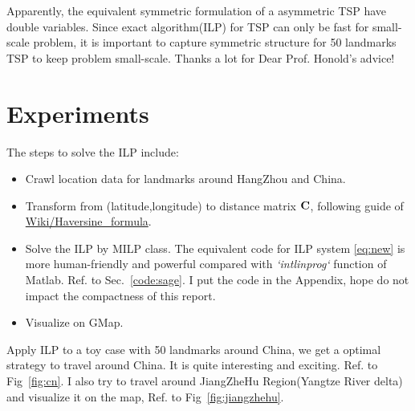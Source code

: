 \documentclass{mcmthesis}
\begin{document}
Apparently, the equivalent symmetric formulation of a asymmetric TSP have double variables. Since  exact algorithm(ILP) for TSP can only  be fast for small-scale problem, it is important to capture symmetric structure for 50 landmarks TSP to keep problem small-scale. Thanks a lot for Dear Prof. Honold's advice!
\section{Experiments}

The steps to solve the ILP include: 
\begin{itemize}[noitemsep,nolistsep]
	\item Crawl location data for landmarks around HangZhou and China. 
	\item Transform from (latitude,longitude)  to distance matrix $\mathbf{C}$, following guide of \href{https://en.wikipedia.org/wiki/Haversine_formula}{Wiki/Haversine\_formula}\cite{bib:wiki}. 
	\item Solve the ILP by MILP class. The equivalent code for ILP system \eqref{eq:new} is more human-friendly and powerful compared with \textit{`intlinprog`} function of Matlab.  
	Ref. to Sec.~\vref{code:sage}. 
	I put the code in the Appendix, hope do not impact the compactness of this report.
	\item Visualize on GMap. \cite{bib:gmap}
\end{itemize}
%

Apply ILP to a toy case with 50 landmarks around China, we get a optimal strategy to travel around China. It is quite interesting and exciting. Ref. to Fig~\vref{fig:cn}.   I also try to travel around JiangZheHu Region(Yangtze River delta) and visualize it on the map, Ref. to Fig~\vref{fig:jiangzhehu}. 
\end{document}
